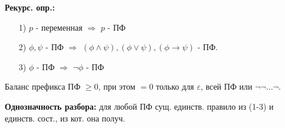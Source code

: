 \textbf{Рекурс. опр.:}
\begin{itemize}
    \item [1) ] $p$ - переменная $\Rightarrow$ $p$ - ПФ 
    \item [2) ] $\phi, \psi$ - ПФ $\Rightarrow$ $(\phi \land \psi), (\phi \lor \psi), (\phi \rightarrow \psi)$ - ПФ.
    \item [3) ] $\phi$ - ПФ $\Rightarrow$ $\neg\phi$ - ПФ
\end{itemize}

\begin{lemma}[О балансе]
Баланс префикса ПФ $\geq 0$, при этом $ = 0$ только для $\varepsilon$, всей ПФ или $\neg\neg\ldots\neg$.
\end{lemma}
\begin{note}
\textbf{Однозначность разбора:} для любой ПФ сущ. единств. правило из (1-3) и единств. сост., из кот. она получ.
\end{note}

